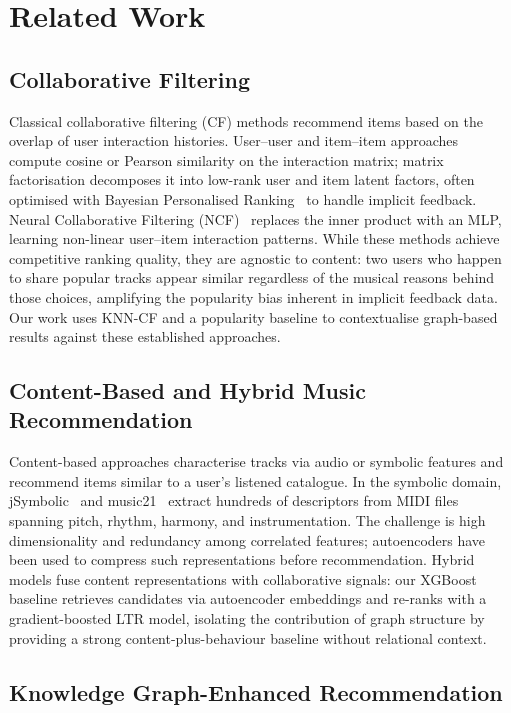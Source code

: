 \section{Related Work}
\label{sec:related}

\subsection{Collaborative Filtering}

Classical collaborative filtering (CF) methods recommend items based on the overlap of user interaction histories. User--user and item--item approaches compute cosine or Pearson similarity on the interaction matrix; matrix factorisation decomposes it into low-rank user and item latent factors, often optimised with Bayesian Personalised Ranking~\cite{rendle2009bpr} to handle implicit feedback. Neural Collaborative Filtering (NCF)~\cite{he2017ncf} replaces the inner product with an MLP, learning non-linear user--item interaction patterns. While these methods achieve competitive ranking quality, they are agnostic to content: two users who happen to share popular tracks appear similar regardless of the musical reasons behind those choices, amplifying the popularity bias inherent in implicit feedback data. Our work uses KNN-CF and a popularity baseline to contextualise graph-based results against these established approaches.

\subsection{Content-Based and Hybrid Music Recommendation}

Content-based approaches characterise tracks via audio or symbolic features and recommend items similar to a user's listened catalogue. In the symbolic domain, jSymbolic~\cite{mckay2018jsymbolic} and music21~\cite{music21docs} extract hundreds of descriptors from MIDI files spanning pitch, rhythm, harmony, and instrumentation. The challenge is high dimensionality and redundancy among correlated features; autoencoders have been used to compress such representations before recommendation. Hybrid models fuse content representations with collaborative signals: our XGBoost baseline retrieves candidates via autoencoder embeddings and re-ranks with a gradient-boosted LTR model, isolating the contribution of graph structure by providing a strong content-plus-behaviour baseline without relational context.

\subsection{Knowledge Graph-Enhanced Recommendation}

